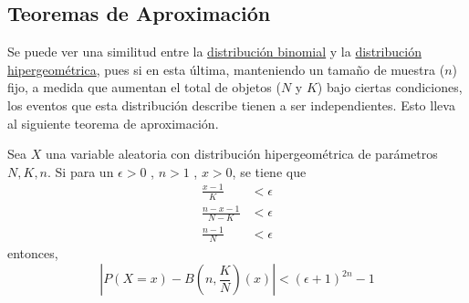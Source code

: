 \subsection{Teoremas de Aproximación}
Se puede ver una similitud entre la \hyperref[dist:binom]{distribución binomial}
y la \hyperref[dist:hip]{distribución hipergeométrica}, pues si en esta última, manteniendo
un tamaño de muestra ($n$) fijo, a medida que aumentan el total de objetos ($N$ y $K$) bajo
ciertas condiciones, los eventos que esta distribución describe tienen a ser independientes.
Esto lleva al siguiente teorema de aproximación.

\begin{Teo}
  Sea $X$ una variable aleatoria con distribución hipergeométrica de
  parámetros $N,K,n$. Si para un $\epsilon>0$ , $n > 1$ , $x > 0$,
  se tiene que
  \begin{align*}
    \frac{x-1}{K}     &< \epsilon\\
    \frac{n-x-1}{N-K} &< \epsilon\\
    \frac{n-1}{N}     &< \epsilon
  \end{align*}
  entonces,
  \[\left|P(X=x) - B\left(n,\frac{K}{N}\right)(x)\right| < (\epsilon + 1)^{2n} - 1\]
\end{Teo}

